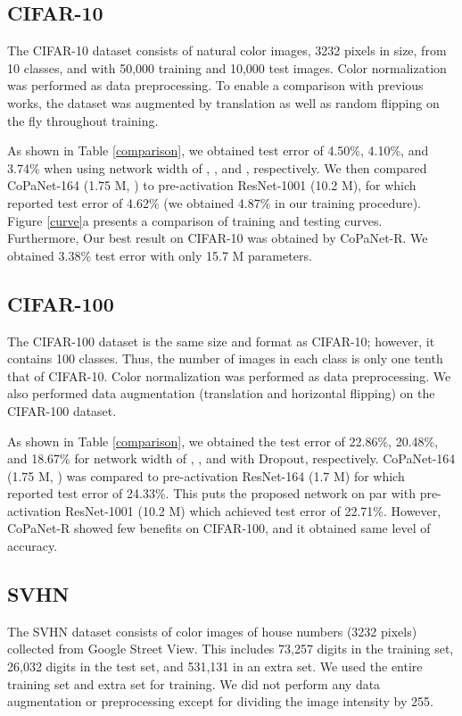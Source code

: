 \documentclass[wcp]{jmlr}
\begin{document}
\subsection{CIFAR-10}
The CIFAR-10 dataset consists of natural color images, 3232 pixels in size, from 10 classes, and with 50,000 training and 10,000 test images. Color normalization was performed as data preprocessing. To enable a comparison with previous works, the dataset was augmented by translation as well as random flipping on the fly throughout training. 

As shown in Table \ref{comparison}, we obtained test error of 4.50\%, 4.10\%, and 3.74\% when using network width of , , and , respectively. 
We then compared CoPaNet-164 (1.75 M, ) to pre-activation ResNet-1001 (10.2 M), for which ~\cite{he2016identity} reported test error of 4.62\% (we obtained 4.87\% in our training procedure). 
Figure \ref{curve}a presents a comparison of training and testing curves. 
Furthermore, Our best result on CIFAR-10 was obtained by CoPaNet-R.
We obtained 3.38\% test error with only 15.7 M parameters.


\subsection{CIFAR-100}
The CIFAR-100 dataset is the same size and format as CIFAR-10; however, it contains 100 classes. 
Thus, the number of images in each class is only one tenth that of CIFAR-10. Color normalization was performed as data preprocessing. 
We also performed data augmentation (translation and horizontal flipping) on the CIFAR-100 dataset.

As shown in Table \ref{comparison}, we obtained the test error of 22.86\%, 20.48\%, and 18.67\% for network width of , , and  with Dropout, respectively.
CoPaNet-164 (1.75 M, ) was compared to pre-activation ResNet-164 (1.7 M) for which ~\cite{he2016identity} reported test error of 24.33\%. 
This puts the proposed network on par with pre-activation ResNet-1001 (10.2 M) which achieved test error of 22.71\%.
However, CoPaNet-R showed few benefits on CIFAR-100, and it obtained same level of accuracy.

\subsection{SVHN}
The SVHN dataset consists of color images of house numbers (3232 pixels) collected from Google Street View. 
This includes 73,257 digits in the training set, 26,032 digits in the test set, and 531,131 in an extra set. 
We used the entire training set and extra set for training. 
We did not perform any data augmentation or preprocessing except for dividing the image intensity by 255.
\end{document}
